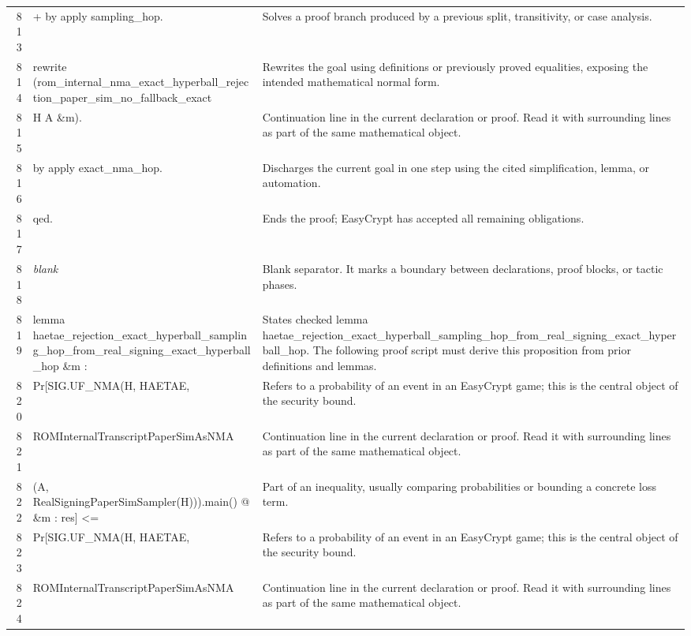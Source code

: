 \documentclass[10pt]{article}
\begin{document}
\begin{longtable}{r L{0.53\textwidth} L{0.37\textwidth}}
813 & {\ttfamily\scriptsize + by apply sampling\_hop.} & Solves a proof branch produced by a previous split, transitivity, or case analysis. \\
814 & {\ttfamily\scriptsize rewrite (rom\_internal\_nma\_exact\_hyperball\_rejection\_paper\_sim\_no\_fallback\_exact} & Rewrites the goal using definitions or previously proved equalities, exposing the intended mathematical normal form. \\
815 & {\ttfamily\scriptsize            H A \&m).} & Continuation line in the current declaration or proof.  Read it with surrounding lines as part of the same mathematical object. \\
816 & {\ttfamily\scriptsize by apply exact\_nma\_hop.} & Discharges the current goal in one step using the cited simplification, lemma, or automation. \\
817 & {\ttfamily\scriptsize qed.} & Ends the proof; EasyCrypt has accepted all remaining obligations. \\
818 & {\ttfamily\scriptsize \emph{blank}} & Blank separator.  It marks a boundary between declarations, proof blocks, or tactic phases. \\
819 & {\ttfamily\scriptsize lemma haetae\_rejection\_exact\_hyperball\_sampling\_hop\_from\_real\_signing\_exact\_hyperball\_hop \&m :} & States checked lemma haetae\_rejection\_exact\_hyperball\_sampling\_hop\_from\_real\_signing\_exact\_hyperball\_hop.  The following proof script must derive this proposition from prior definitions and lemmas. \\
820 & {\ttfamily\scriptsize   Pr[SIG.UF\_NMA(H, HAETAE,} & Refers to a probability of an event in an EasyCrypt game; this is the central object of the security bound. \\
821 & {\ttfamily\scriptsize        ROMInternalTranscriptPaperSimAsNMA} & Continuation line in the current declaration or proof.  Read it with surrounding lines as part of the same mathematical object. \\
822 & {\ttfamily\scriptsize          (A, RealSigningPaperSimSampler(H))).main() @ \&m : res] <=} & Part of an inequality, usually comparing probabilities or bounding a concrete loss term. \\
823 & {\ttfamily\scriptsize   Pr[SIG.UF\_NMA(H, HAETAE,} & Refers to a probability of an event in an EasyCrypt game; this is the central object of the security bound. \\
824 & {\ttfamily\scriptsize        ROMInternalTranscriptPaperSimAsNMA} & Continuation line in the current declaration or proof.  Read it with surrounding lines as part of the same mathematical object. \\

\end{longtable}
\end{document}
